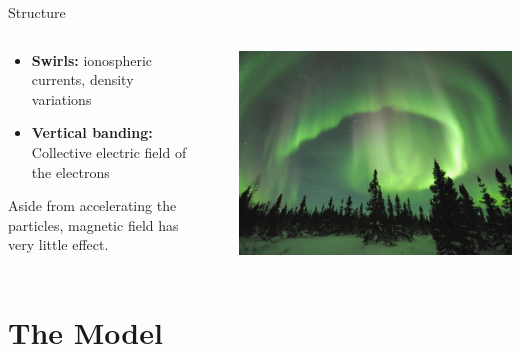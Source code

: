 \documentclass[xcolor=pdftex,dvipsnames,table,usenames,11pt]{beamer}
\begin{document}
\begin{frame}{Structure}
\begin{columns}[onlytextwidth]
  \begin{column}{0.5\textwidth}

    \begin{itemize}
        \item \textbf{Swirls:} ionospheric currents, density variations
        \item \textbf{Vertical banding:} Collective electric field of the electrons
    \end{itemize}

    Aside from accelerating the particles, magnetic field has very little effect.

  \end{column}
  \begin{column}{0.05\textwidth}
  \end{column}
  \begin{column}{0.5\textwidth}
    \includegraphics[width=\textwidth]{img/ab_swirls.jpg}
  \end{column}
\end{columns} 

\end{frame}













\section{The Model}
\end{document}
